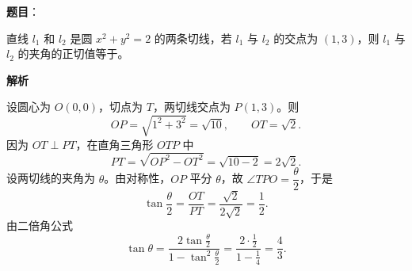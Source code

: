 \begin{answer}

\textbf{题目}：

直线 $l_1$ 和 $l_2$ 是圆 $x^2+y^2=2$ 的两条切线，若 $l_1$ 与 $l_2$ 的交点为 $(1,3)$，则 $l_1$ 与 $l_2$ 的夹角的正切值等于\gkblank{}。

\textbf{解析}

设圆心为 $O(0,0)$，切点为 $T$，两切线交点为 $P(1,3)$。则
\nopagebreak[4]
\[OP=\sqrt{1^2+3^2}=\sqrt{10},\qquad OT=\sqrt2.\]
因为 $OT\perp PT$，在直角三角形 $OTP$ 中
\nopagebreak[4]
\[PT=\sqrt{OP^2-OT^2}=\sqrt{10-2}=2\sqrt2.\]
设两切线的夹角为 $\theta$。由对称性，$OP$ 平分 $\theta$，故 $\angle TPO=\dfrac{\theta}{2}$，于是
\nopagebreak[4]
\[\tan\frac{\theta}{2}=\frac{OT}{PT}=\frac{\sqrt2}{2\sqrt2}=\frac12.\]
由二倍角公式
\nopagebreak[4]
\[\tan\theta=\frac{2\tan\frac{\theta}{2}}{1-\tan^2\frac{\theta}{2}}
=\frac{2\cdot\frac12}{1-\frac14}=\frac43.\]


\end{answer}
